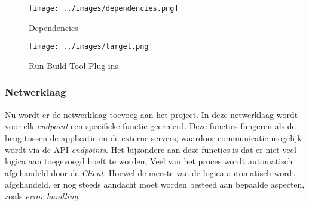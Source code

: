 \begin{figure}[htbp]
    \centering
    \texttt{[image: ../images/dependencies.png]}
    \caption{Dependencies}
    
\end{figure}
\begin{figure}[htbp]
    \centering
    \texttt{[image: ../images/target.png]}
    \caption{Run Build Tool Plug-ins}
    
\end{figure}



\subsubsection{Netwerklaag}
Nu wordt er de netwerklaag toevoeg aan het project. In deze netwerklaag wordt voor elk \textit{endpoint} een specifieke functie gecreëerd. Deze functies fungeren als de brug tussen de applicatie en de externe servers, waardoor communicatie mogelijk wordt via de API-\textit{endpoints}. Het bijzondere aan deze functies is dat er niet veel logica aan toegevoegd hoeft te worden, Veel van het proces wordt automatisch afgehandeld door de \textit{Client}. 
Hoewel de meeste van de logica automatisch wordt afgehandeld, er nog steeds aandacht moet worden besteed aan bepaalde aspecten, zoals \textit{error handling}. 

